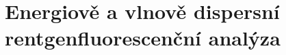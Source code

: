 \section[Rentgenofluorescenční analýza]{Energiově a vlnově dispersní rentgenfluorescenční analýza}

